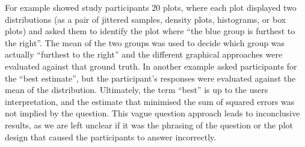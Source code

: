 \documentclass[
  12pt]{article}
\begin{document}
For example \citet{Hofmann2012} showed study participants 20 plots,
where each plot displayed two distributions (as a pair of jittered
samples, density plots, histograms, or box plots) and asked them to
identify the plot where ``the blue group is furthest to the right''. The
mean of the two groups was used to decide which group was actually
``furthest to the right'' and the different graphical approaches were
evaluated against that ground truth. In another example
\citet{Ibrekk1987} asked participants for the ``best estimate'', but the
participant's responses were evaluated against the mean of the
distribution. Ultimately, the term ``best'' is up to the users
interpretation, and the estimate that minimised the sum of squared
errors was not implied by the question. This vague question approach
leads to inconclusive results, as we are left unclear if it was the
phrasing of the question or the plot design that caused the participants
to answer incorrectly.
\end{document}
